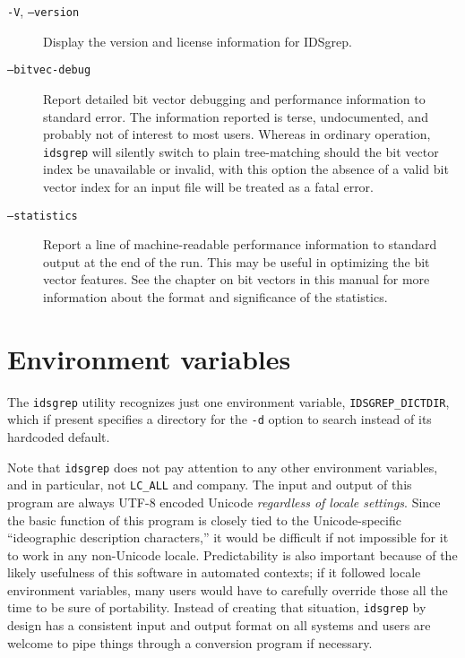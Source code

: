 \documentclass[twocolumn]{report}
\newcommand{\DangerousBend}{\marginpar{\large\hfill\dbend\hfill\null}}
\begin{document}
\begin{description}
\item[\texttt{-V}, \texttt{--version}] Display the version and license
information for IDSgrep.

\item[\texttt{--bitvec-debug}]
Report \DangerousBend detailed bit vector debugging and performance
information to standard error.
The information reported is terse, undocumented, and probably not of
interest to most users.
Whereas in ordinary operation, \texttt{idsgrep}
will silently switch to plain tree-matching should the bit vector index
be unavailable or invalid, with this option the
absence of a valid bit vector index for an input file will be
treated as a fatal error.

\item[\texttt{--statistics}]
Report \DangerousBend a line of machine-readable performance information
to standard output at the end of the run.  This may be useful in
optimizing the bit vector features.  See the chapter on bit vectors in this
manual for more information about the format and significance of the
statistics.

\end{description}


\section{Environment variables}

The \texttt{idsgrep} utility recognizes just one environment variable,
\texttt{IDSGREP\_DICTDIR}, which if present specifies a directory for the
\texttt{-d} option to search instead of its hardcoded default.

Note that \texttt{idsgrep} does not pay attention to any other environment
variables, and in particular, not \texttt{LC\_ALL} and company.  The input
and output of this program are always UTF-8 encoded Unicode \emph{regardless
of locale settings}.  Since the basic function of this program is closely
tied to the Unicode-specific ``ideographic description characters,'' it
would be difficult if not impossible for it to work in any non-Unicode
locale.  Predictability is also important because of the likely usefulness
of this software in automated contexts; if it followed locale environment
variables, many users would have to carefully override those all the time to
be sure of portability.  Instead of creating that situation,
\texttt{idsgrep} by design has a consistent input and output format on all
systems and users are welcome to pipe things through
a conversion program if necessary.
\end{document}
